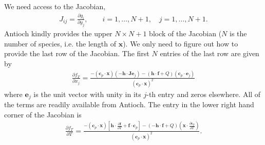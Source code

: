 \documentclass{article}
\newcommand{\lr}[1]{\left(#1\right)}
\begin{document}
  We need access to the Jacobian,
  \begin{align}
    J_{ij} = \frac{\partial g_{i}}{\partial y_{j}}, \qquad i = 1, \ldots, N+1, \quad j = 1, \ldots, N+1.
  \end{align}
  Antioch kindly provides the upper $N\times N+1$ block of the Jacobian ($N$ is the number of species, 
  i.e. the length of $\mathbf{x}$).  We only need to figure out how to provide the last row of the 
  Jacobian.  The first $N$ entries of the last row are given by 
  \begin{align}
    \frac{\partial f_{T}}{\partial x_{j}} = 
      \frac{\displaystyle -\lr{\mathbf{c}_{p}\cdot\mathbf{x}}\lr{-\mathbf{h}\cdot\mathbf{J}\mathbf{e}_{j}} - 
             \lr{\mathbf{h}\cdot\mathbf{f} + Q}\lr{\mathbf{c}_{p}\cdot\mathbf{e}_{j}}}
           {\lr{\displaystyle \mathbf{c}_{p}\cdot\mathbf{x}}^{2}}
  \end{align}
  where $\mathbf{e}_{j}$ is the unit vector with unity in its $j$-th entry and zeros elsewhere.  All of 
  the terms are readily available from Antioch.  The entry in the lower right hand corner of the 
  Jacobian is 
  \begin{align}
    \frac{\partial f_{T}}{\partial T} = 
      \frac{\displaystyle -\lr{\mathbf{c}_{p}\cdot\mathbf{x}}\left[\mathbf{h}
              \cdot\frac{\partial \mathbf{f}}{\partial T} + \mathbf{f}\cdot\mathbf{c}_{p}\right] - 
            \lr{-\mathbf{h}\cdot\mathbf{f} + Q}\lr{\mathbf{x}\cdot\frac{\partial \mathbf{c}_{p}}{\partial T}}}
           {\displaystyle \lr{\mathbf{c}_{p}\cdot\mathbf{x}}^{2}}.
  \end{align}
\end{document}
